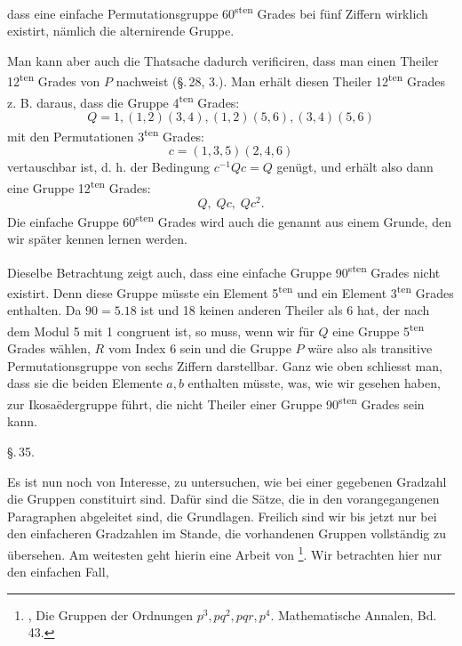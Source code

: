 dass eine einfache Permutationsgruppe 60\textsuperscript{sten} Grades bei fünf Ziffern wirklich existirt, nämlich die alternirende Gruppe.

Man kann aber auch die Thatsache dadurch verificiren, dass man einen Theiler 12\textsuperscript{ten} Grades von $P$ nachweist (\S.\,28, 3.). Man erhält diesen Theiler 12\textsuperscript{ten} Grades z. B. daraus, dass die Gruppe 4\textsuperscript{ten} Grades:
\[
Q = 1, (1, 2) (3, 4), (1, 2) (5, 6), (3, 4) (5, 6)
\]
mit den Permutationen 3\textsuperscript{ten} Grades:
\[
c = (1, 3, 5) (2, 4, 6)
\]
vertauschbar ist, d. h. der Bedingung $c^{-1} Q c = Q$ genügt, und erhält also dann eine Gruppe 12\textsuperscript{ten} Grades:
\[
Q, \; Q c, \; Q c^2.
\]
Die einfache Gruppe 60\textsuperscript{sten} Grades wird auch die  genannt aus einem Grunde, den wir später kennen lernen werden.

Dieselbe Betrachtung zeigt auch, dass eine einfache Gruppe 90\textsuperscript{sten} Grades nicht existirt. Denn diese Gruppe müsste ein Element 5\textsuperscript{ten} und ein Element 3\textsuperscript{ten} Grades enthalten. Da $90 = 5 . 18$ ist und 18 keinen anderen Theiler als 6 hat, der nach dem Modul 5 mit 1 congruent ist, so muss, wenn wir für $Q$ eine Gruppe 5\textsuperscript{ten} Grades wählen, $R$ vom Index 6 sein und die Gruppe $P$ wäre also als transitive Permutationsgruppe von sechs Ziffern darstellbar. Ganz wie oben schliesst man, dass sie die beiden Elemente $a, b$ enthalten müsste, was, wie wir gesehen haben, zur Ikosaëdergruppe führt, die nicht Theiler einer Gruppe 90\textsuperscript{sten} Grades sein kann.

\begin{center}
\S.\,35.

\end{center}

Es ist nun noch von Interesse, zu untersuchen, wie bei einer gegebenen Gradzahl die Gruppen constituirt sind. Dafür sind die Sätze, die in den vorangegangenen Paragraphen abgeleitet sind, die Grundlagen. Freilich sind wir bis jetzt nur bei den einfacheren Gradzahlen im Stande, die vorhandenen Gruppen vollständig zu übersehen. Am weitesten geht hierin eine Arbeit von \footnote{, Die Gruppen der Ordnungen $p^3, pq^2, pqr, p^4$. Mathematische Annalen, Bd. 43.}. Wir betrachten hier nur den einfachen Fall,
